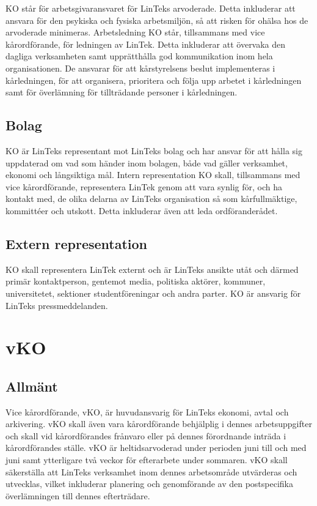 KO står för arbetsgivaransvaret för LinTeks arvoderade. Detta inkluderar
att ansvara för den psykiska och fysiska arbetsmiljön, så att risken för
ohälsa hos de arvoderade minimeras. Arbetsledning KO står, tillsammans
med vice kårordförande, för ledningen av LinTek. Detta inkluderar att
övervaka den dagliga verksamheten samt upprätthålla god kommunikation
inom hela organisationen. De ansvarar för att kårstyrelsens beslut
implementeras i kårledningen, för att organisera, prioritera och följa
upp arbetet i kårledningen samt för överlämning för tillträdande
personer i kårledningen.

\hypertarget{bolag}{%
\subsection{Bolag}\label{bolag}}

KO är LinTeks representant mot LinTeks bolag och har ansvar för att
hålla sig uppdaterad om vad som händer inom bolagen, både vad gäller
verksamhet, ekonomi och långsiktiga mål. Intern representation KO skall,
tillsammans med vice kårordförande, representera LinTek genom att vara
synlig för, och ha kontakt med, de olika delarna av LinTeks organisation
så som kårfullmäktige, kommittéer och utskott. Detta inkluderar även att
leda ordföranderådet.

\hypertarget{extern-representation}{%
\subsection{Extern representation}\label{extern-representation}}

KO skall representera LinTek externt och är LinTeks ansikte utåt och
därmed primär kontaktperson, gentemot media, politiska aktörer,
kommuner, universitetet, sektioner studentföreningar och andra parter.
KO är ansvarig för LinTeks pressmeddelanden.

\hypertarget{vko}{%
\section{vKO}\label{vko}}

\hypertarget{allmuxe4nt-1}{%
\subsection{Allmänt}\label{allmuxe4nt-1}}

Vice kårordförande, vKO, är huvudansvarig för LinTeks ekonomi, avtal och
arkivering. vKO skall även vara kårordförande behjälplig i dennes
arbetsuppgifter och skall vid kårordförandes frånvaro eller på dennes
förordnande inträda i kårordförandes ställe. vKO är heltidsarvoderad
under perioden juni till och med juni samt ytterligare två veckor för
efterarbete under sommaren. vKO skall säkerställa att LinTeks verksamhet
inom dennes arbetsområde utvärderas och utvecklas, vilket inkluderar
planering och genomförande av den postspecifika överlämningen till
dennes efterträdare.

